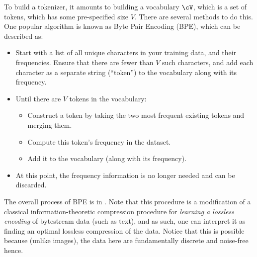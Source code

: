 \documentclass[../../book-main.tex]{subfiles}
\begin{document}
To build a tokenizer, it amounts to building a vocabulary \(\cV\), which is a set of tokens, which has some pre-specified size \(V\). There are several methods to do this. One popular algorithm is known as Byte Pair Encoding (BPE), which can be described as:
\begin{itemize}
    \item Start with a list of all unique characters in your training data, and their frequencies. Ensure that there are fewer than \(V\) such characters, and add each character as a separate string (``token'') to the vocabulary along with its frequency.
    \item Until there are \(V\) tokens in the vocabulary:
    \begin{itemize}
        \item Construct a token by taking the two most frequent existing tokens and merging them.
        \item Compute this token's frequency in the dataset.
        \item Add it to the vocabulary (along with its frequency).
    \end{itemize} 
    \item At this point, the frequency information is no longer needed and can be discarded.
\end{itemize}
The overall process of BPE is in . Note that this procedure is a modification of a classical information-theoretic compression procedure for \textit{learning a lossless encoding} of bytestream data (such as text), and as such, one can interpret it as finding an optimal lossless compression of the data. Notice that this is possible because (unlike images), the data here are fundamentally discrete and noise-free hence.
\end{document}
